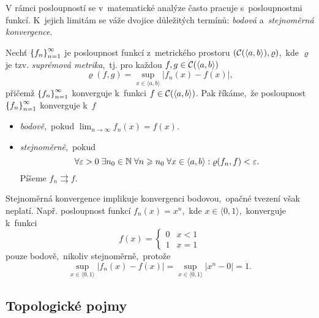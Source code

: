 V rámci posloupností se v~matematické analýze často pracuje s~posloupnostmi funkcí. K~jejich limitám se váže dvojice důležitých termínů: \emph{bodová} a~\emph{stejnoměrná konvergence}.
\begin{definition}\label{def:bodova-stejnomerna-konvergence}
    Nechť $\left\{f_n\right\}_{n=1}^\infty$ je posloupnost funkcí z~metrického prostoru $(\mathcal{C}(\langle a,b\rangle),\varrho)$,~kde $\varrho$ je tzv. \emph{suprémová metrika},~tj. pro každou $f,g\in \mathcal{C}(\langle a,b\rangle)$
    \[\varrho(f,g)=\sup_{x\in\langle a,b\rangle}|f_n(x)-f(x)|,\]
    přičemž $\left\{f_n\right\}_{n=1}^\infty$ konverguje k~funkci $f\in \mathcal{C}(\langle a,b\rangle)$.
    Pak říkáme,~že posloupnost $\left\{f_n\right\}_{n=1}^\infty$ konverguje k~$f$
    \begin{itemize}
        \item \emph{bodově},~pokud $\lim_{n\to\infty}f_n(x)=f(x)$.
        \item \emph{stejnoměrně},~pokud
        \[\forall\varepsilon>0\;\exists n_0\in\mathbb{N}\;\forall n\geqslant n_0\;\forall x\in\langle a,b\rangle: \varrho(f_n,f)<\varepsilon.\]
        Píšeme $f_n\rightrightarrows f$.
    \end{itemize}
\end{definition}
Stejnoměrná konvergence implikuje konvergenci bodovou,~opačné tvezení však neplatí. Např. posloupnost funkcí $f_n(x)=x^n$,~kde $x\in\langle 0,1\rangle$,~konverguje k~funkci 
\[f(x)=\begin{cases}
    0 & x < 1\\
    1 & x = 1
\end{cases}\]
pouze bodově,~nikoliv stejnoměrně,~protože
\[\sup_{x\in\langle 0,1\rangle}|f_n(x)-f(x)|=\sup_{x\in\langle 0,1\rangle}|x^n-0|=1.\]

\subsection{Topologické pojmy}\label{subsec:topologicke-pojmy}

